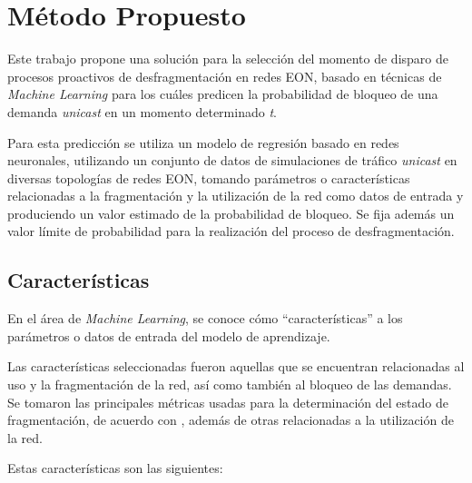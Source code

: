 \chapter{ Método Propuesto }
Este trabajo propone una solución para la selección del momento de disparo de procesos proactivos de desfragmentación en redes EON, basado en técnicas de \textit{Machine Learning} para los cuáles predicen la probabilidad de bloqueo de una demanda \textit{unicast} en un momento determinado \textit{t}.

Para esta predicción se utiliza un modelo de regresión basado en redes neuronales, utilizando un conjunto de datos de simulaciones de tráfico \textit{unicast} en diversas topologías de redes EON, tomando parámetros o características relacionadas a la fragmentación y la utilización de la red como datos de entrada y produciendo un valor estimado de la probabilidad de bloqueo. Se fija además un valor límite de probabilidad para la realización del proceso de desfragmentación.

\section{Características}

En el área de \textit{Machine Learning}, se conoce cómo ``características'' a los parámetros o datos de entrada del modelo de aprendizaje.

Las características seleccionadas fueron aquellas que se encuentran relacionadas al uso y la fragmentación de la red, así como también al bloqueo de las demandas. Se tomaron las principales métricas usadas para la determinación del estado de fragmentación, de acuerdo con \cite{quagliotti2017spectrum}, además de otras relacionadas a la utilización de la red. 

Estas características son las siguientes: 

